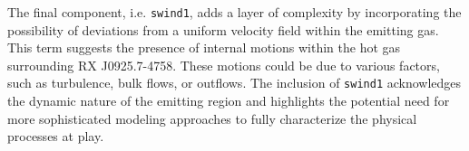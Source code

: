 			The final component, i.e. \texttt{swind1}, adds a layer of complexity by incorporating the possibility of deviations from a uniform velocity field within the emitting gas. This term suggests the presence of internal motions within the hot gas surrounding RX J0925.7-4758. These motions could be due to various factors, such as turbulence, bulk flows, or outflows. The inclusion of \texttt{swind1} acknowledges the dynamic nature of the emitting region and highlights the potential need for more sophisticated modeling approaches to fully characterize the physical processes at play.
			
%			
%			
